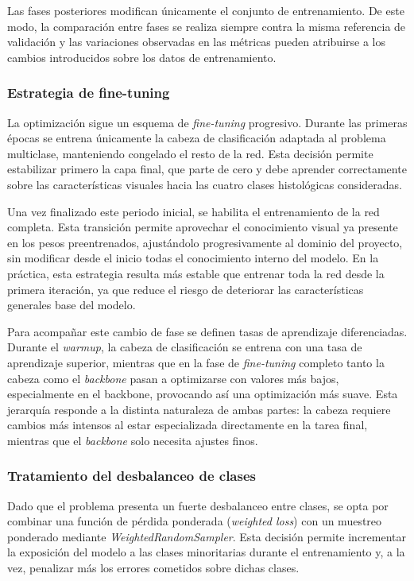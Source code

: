 ﻿\documentclass[10pt,a4paper,twocolumn,twoside]{article}
\begin{document}
Las fases posteriores modifican únicamente el conjunto de entrenamiento. De este modo, la comparación entre fases se realiza siempre contra la misma referencia de validación y las variaciones observadas en las métricas pueden atribuirse a los cambios introducidos sobre los datos de entrenamiento.

\subsubsection{Estrategia de fine-tuning}
La optimización sigue un esquema de \textit{fine-tuning} progresivo. Durante las primeras épocas se entrena únicamente la cabeza de clasificación adaptada al problema multiclase, manteniendo congelado el resto de la red. Esta decisión permite estabilizar primero la capa final, que parte de cero y debe aprender correctamente sobre las características visuales hacia las cuatro clases histológicas consideradas.

Una vez finalizado este periodo inicial, se habilita el entrenamiento de la red completa. Esta transición permite aprovechar el conocimiento visual ya presente en los pesos preentrenados, ajustándolo progresivamente al dominio del proyecto, sin modificar desde el inicio todas el conocimiento interno del modelo. En la práctica, esta estrategia resulta más estable que entrenar toda la red desde la primera iteración, ya que reduce el riesgo de deteriorar las características generales base del modelo.

Para acompañar este cambio de fase se definen tasas de aprendizaje diferenciadas. Durante el \textit{warmup}, la cabeza de clasificación se entrena con una tasa de aprendizaje superior, mientras que en la fase de \textit{fine-tuning} completo tanto la cabeza como el \textit{backbone} pasan a optimizarse con valores más bajos, especialmente en el backbone, provocando así una optimización más suave. Esta jerarquía responde a la distinta naturaleza de ambas partes: la cabeza requiere cambios más intensos al estar especializada directamente en la tarea final, mientras que el \textit{backbone} solo necesita ajustes finos.

\subsubsection{Tratamiento del desbalanceo de clases}
Dado que el problema presenta un fuerte desbalanceo entre clases, se opta por combinar una función de pérdida ponderada (\textit{weighted loss}) con un muestreo ponderado mediante \textit{WeightedRandomSampler}. Esta decisión permite incrementar la exposición del modelo a las clases minoritarias durante el entrenamiento y, a la vez, penalizar más los errores cometidos sobre dichas clases.
\end{document}
